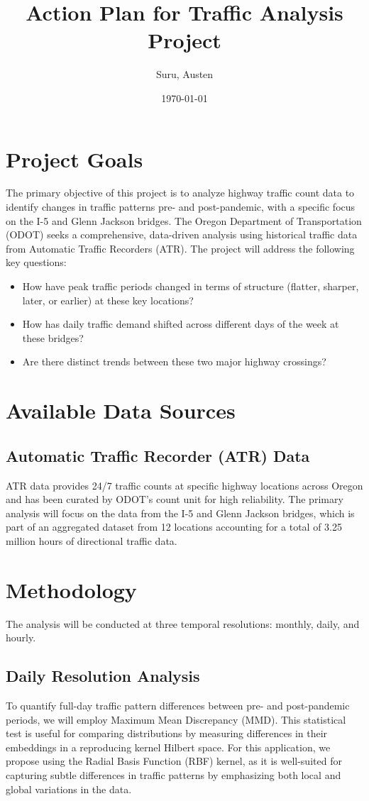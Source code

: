 \documentclass{article}
\title{Action Plan for Traffic Analysis Project}
\author{Suru, Austen}
\date{\today}
\begin{document}
\maketitle

\section{Project Goals}
The primary objective of this project is to analyze highway traffic count data to identify changes in traffic patterns pre- and post-pandemic, with a specific focus on the I-5 and Glenn Jackson bridges. The Oregon Department of Transportation (ODOT) seeks a comprehensive, data-driven analysis using historical traffic data from Automatic Traffic Recorders (ATR). The project will address the following key questions:

\begin{itemize}
    \item How have peak traffic periods changed in terms of structure (flatter, sharper, later, or earlier) at these key locations?
    \item How has daily traffic demand shifted across different days of the week at these bridges?
    \item Are there distinct trends between these two major highway crossings?
\end{itemize}

\section{Available Data Sources}
\subsection{Automatic Traffic Recorder (ATR) Data}
ATR data provides 24/7 traffic counts at specific highway locations across Oregon and has been curated by ODOT’s count unit for high reliability. The primary analysis will focus on the data from the I-5 and Glenn Jackson bridges, which is part of an aggregated dataset from 12 locations accounting for a total of 3.25 million hours of directional traffic data.

\section{Methodology}
The analysis will be conducted at three temporal resolutions: monthly, daily, and hourly.

\subsection{Daily Resolution Analysis}
To quantify full-day traffic pattern differences between pre- and post-pandemic periods, we will employ Maximum Mean Discrepancy (MMD). This statistical test is useful for comparing distributions by measuring differences in their embeddings in a reproducing kernel Hilbert space. For this application, we propose using the Radial Basis Function (RBF) kernel, as it is well-suited for capturing subtle differences in traffic patterns by emphasizing both local and global variations in the data.
\end{document}
